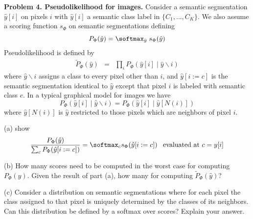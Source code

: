 \documentclass{article}
\newcommand{\solution}[1]{}
\begin{document}
\bigskip
{\bf Problem 4. Pseudolikelihood for images.} Consider a semantic segmentation $\hat{y}[i]$ on pixels $i$ with $\hat{y}[i]$
a semantic class label in $\{C_1,\ldots,C_K\}$.  We also assume a scoring function $s_\Phi$ on semantic segmentations defining
$$P_\Phi(\hat{y}) = \softmax_{\hat{y}}\;s_\Phi(\hat{y})$$
Pseudolikelihood is defined by
\begin{eqnarray*}
  \tilde{P}_\Phi(\hat{y}) & = & \prod_i P_\Phi(\hat{y}[i] \;|\; \hat{y}\backslash i)
\end{eqnarray*}
where $\hat{y}\backslash i$ assigns a class to every pixel other than $i$, and $\hat{y}[i:=c]$ is the semantic
segmentation identical to $\hat{y}$ except that pixel $i$ is labeled with semantic class $c$.  In a typical graphical model for images we have
$$P_\Phi(\hat{y}[i]\; |\; \hat{y}\backslash i) = P_\Phi(\hat{y}[i]\; | \;\hat{y}[N(i)])$$
where $\hat{y}[N(i)]$ is $\hat{y}$ restricted to those pixels which are neighbors of pixel $i$.

\medskip
(a) show
$$\frac{P_\Phi(\hat{y})}{\sum_c P_\Phi(\hat{y}[i:=c])} = \softmax_c s_\Phi(\hat{y}[i:=c])\;\;\;\mbox{evaluated at $c = y[i]$}$$

\solution{
\begin{eqnarray*}
  \frac{P_\Phi(\hat{y})}{\sum_c P_\Phi(\hat{y}[i:=c])} & = & \frac{\frac{1}{Z} e^{s_\Phi(\hat{y})}}{\sum_c \frac{1}{Z} e^{s_\Phi(\hat{y}[i:=c])}} \\
  \\
  & = & \frac{e^{s_\Phi(\hat{y})}}{\sum_c e^{s_\Phi(\hat{y}[i:=c])}} \\
  \\
  & = & \softmax_c\;s_\Phi(\hat{y}[i:=c]) \;\; \mbox{evaluated at $c = \hat{y}[i]$}
\end{eqnarray*}
}

\medskip
(b) How many scores need to be computed in the worst case for computing $P_\Phi(\hat{y})$.  Given the result of part (a), how many for computing $\tilde{P}_\Phi(\hat{y})$?

\solution{$K^N$ for $P_\Phi$ and $KN$ for $\tilde{P}_\Phi$.}

\medskip
(c) Consider a distribution on semantic segmentations where for each pixel the class assigned to that pixel is uniquely determined by the classes of its neighbors.
Can this distribution be defined by a softmax over scores?  Explain your answer.

\solution{
  No. Since $e^s > 0$ for any finite $s$, all semantic segmentations must have nonzero probability.
}
\end{document}
